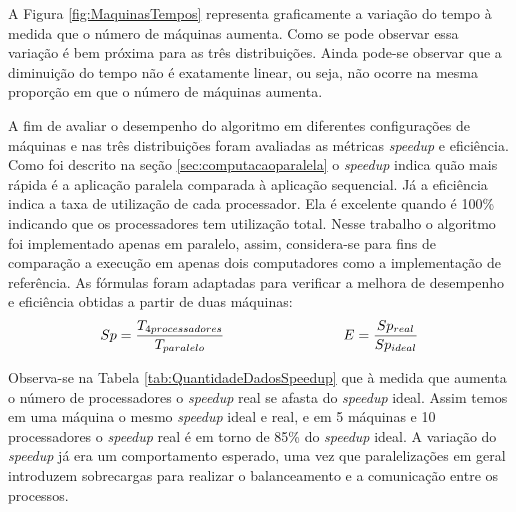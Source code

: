 A Figura \ref{fig:MaquinasTempos} representa graficamente a variação do tempo à medida que o número de máquinas aumenta. Como se pode observar essa variação é bem próxima para as três distribuições. Ainda pode-se observar que a diminuição do tempo não é exatamente linear, ou seja, não ocorre na mesma proporção em que o número de máquinas aumenta. 



A fim de avaliar o desempenho do algoritmo em diferentes configurações de máquinas e nas três distribuições foram avaliadas as métricas \textit{speedup} e eficiência. %
Como foi descrito na seção \ref{sec:computacaoparalela} o \textit{speedup} indica quão mais rápida é a aplicação paralela comparada à aplicação sequencial. Já a eficiência  indica a taxa de utilização de cada processador. Ela é  excelente quando é 100\% indicando que os processadores tem utilização total.
Nesse trabalho o algoritmo foi implementado apenas em paralelo, assim, considera-se para fins de comparação a execução em apenas dois computadores como a implementação de referência. As fórmulas foram adaptadas para verificar a melhora de desempenho e eficiência obtidas a partir de duas máquinas: 
\[ Sp = \frac{T_{4 processadores}}{T_{paralelo}}    \hspace*{3cm}  E = \frac{Sp_{real}}{Sp_{ideal}}\]

Observa-se na Tabela \ref{tab:QuantidadeDadosSpeedup} que à medida que aumenta o número de processadores o \textit{speedup} real se afasta do \textit{speedup} ideal. Assim temos em uma máquina o mesmo \textit{speedup} ideal e real, e em 5 máquinas e 10 processadores o \textit{speedup} real é em torno de 85\% do \textit{speedup} ideal. A variação do \textit{speedup} já era um comportamento esperado, uma vez que paralelizações em geral introduzem sobrecargas para realizar o balanceamento e a comunicação entre os processos.


